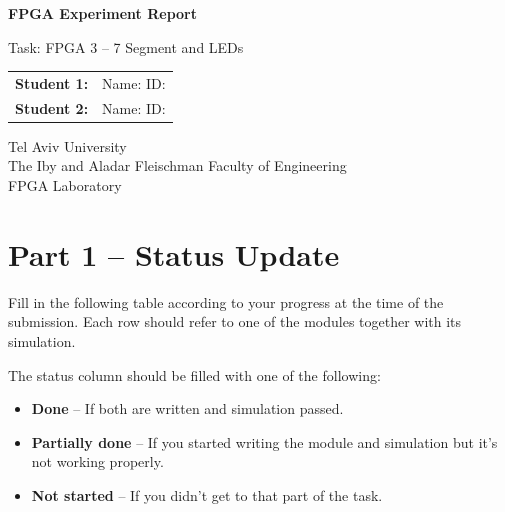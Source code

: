 \documentclass[12pt,a4paper]{article}
\begin{document}
\begin{titlepage}
    \centering
    \vspace*{2cm}
    {\LARGE \textbf{FPGA Experiment Report} \par}
    \vspace{1cm}
    {\Large Task: FPGA 3 -- 7 Segment and LEDs \par}
    \vspace{2cm}
    {\large
    \begin{tabular}{ll}
        \textbf{Student 1:} & Name: \underline{\hspace{4cm}} \quad ID: \underline{\hspace{3cm}} \\[10pt]
        \textbf{Student 2:} & Name: \underline{\hspace{4cm}} \quad ID: \underline{\hspace{3cm}} \\
    \end{tabular}
    \par}
    \vspace{2cm}
    {\large Tel Aviv University \\
    The Iby and Aladar Fleischman Faculty of Engineering \\
    FPGA Laboratory \par}
    \vfill
\end{titlepage}

\section*{Part 1 -- Status Update}

Fill in the following table according to your progress at the time of the submission.
Each row should refer to one of the modules together with its simulation.

The status column should be filled with one of the following:
\begin{itemize}[nosep]
    \item \textbf{Done} -- If both are written and simulation passed.
    \item \textbf{Partially done} -- If you started writing the module and simulation but it's not working properly.
    \item \textbf{Not started} -- If you didn't get to that part of the task.
\end{itemize}
\end{document}
